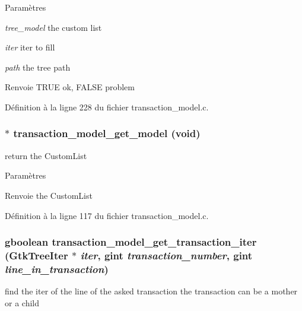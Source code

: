 \begin{DoxyParams}{Paramètres}
\item[{\em tree\_\-model}]the custom list \item[{\em iter}]iter to fill \item[{\em path}]the tree path\end{DoxyParams}
\begin{DoxyReturn}{Renvoie}
TRUE ok, FALSE problem 
\end{DoxyReturn}


Définition à la ligne 228 du fichier transaction\_\-model.c.

\subsubsection[{transaction\_\-model\_\-get\_\-model}]{$\ast$ transaction\_\-model\_\-get\_\-model (void)}\label{transaction__model_8h_a416a1ee9231b6f7d74d3b0811902163a}
return the CustomList


\begin{DoxyParams}{Paramètres}
\item[{\em }]\end{DoxyParams}
\begin{DoxyReturn}{Renvoie}
the CustomList 
\end{DoxyReturn}


Définition à la ligne 117 du fichier transaction\_\-model.c.

\subsubsection[{transaction\_\-model\_\-get\_\-transaction\_\-iter}]{\setlength{\rightskip}{0pt plus 5cm}gboolean transaction\_\-model\_\-get\_\-transaction\_\-iter (GtkTreeIter $\ast$ {\em iter}, \/  gint {\em transaction\_\-number}, \/  gint {\em line\_\-in\_\-transaction})}\label{transaction__model_8h_af10137737c1d42087c8fed2fa2d8c9ee}
find the iter of the line of the asked transaction the transaction can be a mother or a child


